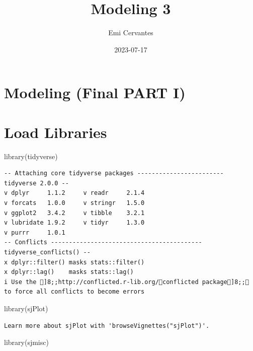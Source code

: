 \documentclass[
  letterpaper,
  DIV=11,
  numbers=noendperiod]{scrartcl}
\title{Modeling 3}
\author{Emi Cervantes}
\date{2023-07-17}
\newenvironment{Shaded}{\begin{snugshade}}{\end{snugshade}}
\newcommand{\FunctionTok}[1]{\textcolor[rgb]{0.02,0.16,0.49}{#1}}
\newcommand{\NormalTok}[1]{\textcolor[rgb]{0.00,0.44,0.13}{#1}}
\renewcommand*\contentsname{Table of contents}
\newcommand\contentsname{Table of contents}
\begin{document}
\maketitle
\renewcommand*\contentsname{Table of contents}
{
\hypersetup{linkcolor=}
\setcounter{tocdepth}{3}
\tableofcontents
}
\hypertarget{modeling-final-part-i}{%
\section{Modeling (Final PART I)}\label{modeling-final-part-i}}

\hypertarget{load-libraries}{%
\section{Load Libraries}\label{load-libraries}}

\begin{Shaded}
\begin{Highlighting}[]
\FunctionTok{library}\NormalTok{(tidyverse)}
\end{Highlighting}
\end{Shaded}

\begin{verbatim}
-- Attaching core tidyverse packages ------------------------ tidyverse 2.0.0 --
v dplyr     1.1.2     v readr     2.1.4
v forcats   1.0.0     v stringr   1.5.0
v ggplot2   3.4.2     v tibble    3.2.1
v lubridate 1.9.2     v tidyr     1.3.0
v purrr     1.0.1     
-- Conflicts ------------------------------------------ tidyverse_conflicts() --
x dplyr::filter() masks stats::filter()
x dplyr::lag()    masks stats::lag()
i Use the ]8;;http://conflicted.r-lib.org/conflicted package]8;; to force all conflicts to become errors
\end{verbatim}

\begin{Shaded}
\begin{Highlighting}[]
\FunctionTok{library}\NormalTok{(sjPlot)}
\end{Highlighting}
\end{Shaded}

\begin{verbatim}
Learn more about sjPlot with 'browseVignettes("sjPlot")'.
\end{verbatim}

\begin{Shaded}
\begin{Highlighting}[]
\FunctionTok{library}\NormalTok{(sjmisc)}
\end{Highlighting}
\end{Shaded}
\end{document}
